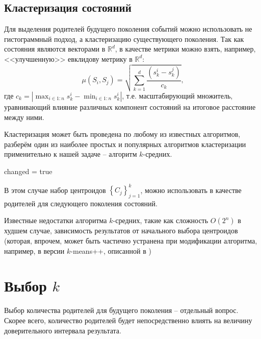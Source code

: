 \documentclass[12pt,a4paper]{article}
\newcommand{\R}{\ensuremath{\mathbb{R}}}
\begin{document}
\subsection{Кластеризация состояний}
Для выделения родителей будущего поколения событий можно использовать не гистограммный подход, а кластеризацию существующего поколения. Так как состояния являются векторами в $\R^d$, в качестве метрики можно взять, например, <<улучшенную>> евклидову метрику в $\R^d$:
\[\mu\left(S_i,S_j\right) = \sqrt{\sum_{k=1}^d\frac{\left(s^i_k-s^j_k\right)}{c_k}} \text{,} \] 
где $c_k = \left\vert\max_{i\in 1:n} s^i_k - \min_{i\in 1:n} s^i_k\right\vert$, т.е. масштабирующий множитель, уравнивающий влияние различных компонент состояний на итоговое расстояние между ними.
\par Кластеризация может быть проведена по любому из известных алгоритмов, разберём один из наиболее простых и популярных алгоритмов кластеризации применительно к нашей задаче -- алгоритм $k$-средних.
\begin{algorithm}
	\SetAlgoLined
	\DontPrintSemicolon
	changed = true\;
\end{algorithm}
\par В этом случае набор центроидов $\left\lbrace C_j\right\rbrace_{j=1}^k$, можно использовать в качестве родителей для следующего поколения состояний.
\par Известные недостатки алгоритма $k$-средних, такие как сложность $O\left(2^n\right)$ в худшем случае, зависимость результатов от начального выбора центроидов (которая, впрочем, может быть частично устранена при модификации алгоритма, например, в версии $k$-means++, описанной в \cite{Arthur2007})
\section{Выбор $k$}
	Выбор количества родителей для будущего поколения -- отдельный вопрос. Скорее всего, количество родителей будет непосредственно влиять на величину доверительного интервала результата. 
\nocite{*}
\printbibliography
\end{document}
